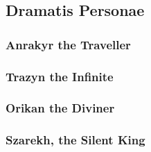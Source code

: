 \hspace{0.5em}


\newpage
\subsection{Dramatis Personae}

\subsubsection{Anrakyr the Traveller}

\newpage
\subsubsection{Trazyn the Infinite}

\newpage
\subsubsection{Orikan the Diviner}

\newpage
\subsubsection{Szarekh, the Silent King}